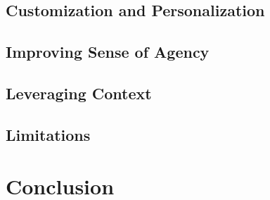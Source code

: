 \subsection{Customization and Personalization}

\subsection{Improving Sense of Agency}

\subsection{Leveraging Context}

\subsection{Limitations}

\section{Conclusion}


\noindent
{}




